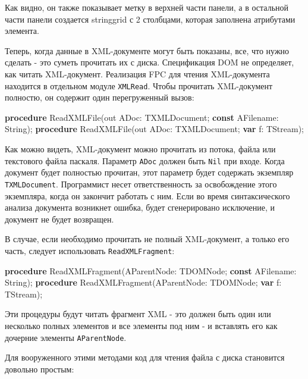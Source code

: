 \documentclass[
]{article}
\newenvironment{Shaded}{}{}
\newcommand{\DataTypeTok}[1]{\textcolor[rgb]{0.56,0.13,0.00}{#1}}
\newcommand{\KeywordTok}[1]{\textcolor[rgb]{0.00,0.44,0.13}{\textbf{#1}}}
\newcommand{\NormalTok}[1]{#1}
\begin{document}
Как видно, он также показывает метку в верхней части панели, а в
остальной части панели создается stringgrid с 2 столбцами, которая
заполнена атрибутами элемента.

Теперь, когда данные в XML-документе могут быть показаны, все, что нужно
сделать - это суметь прочитать их с диска. Спецификация DOM не
определяет, как читать XML-документ. Реализация FPC для чтения
XML-документа находится в отдельном модуле \texttt{XMLRead}. Чтобы
прочитать XML-документ полностю, он содержит один перегруженный вызов:

\begin{Shaded}
\begin{Highlighting}[]
\KeywordTok{procedure}\NormalTok{ ReadXMLFile(out ADoc: TXMLDocument; }\KeywordTok{const}\NormalTok{ AFilename: }\DataTypeTok{String}\NormalTok{);}
\KeywordTok{procedure}\NormalTok{ ReadXMLFile(out ADoc: TXMLDocument; }\KeywordTok{var}\NormalTok{ f: TStream);}
\end{Highlighting}
\end{Shaded}

Как можно видеть, XML-документ можно прочитать из потока, файла или
текстового файла паскаля. Параметр \texttt{ADoc} должен быть
\texttt{Nil} при входе. Когда документ будет полностью прочитан, этот
параметр будет содержать экземпляр \texttt{TXMLDocument}. Программист
несет ответственность за освобождение этого экземпляра, когда он
закончит работать с ним. Если во время синтаксического анализа документа
возникнет ошибка, будет сгенерировано исключение, и документ не будет
возвращен.

В случае, если необходимо прочитать не полный XML-документ, а только его
часть, следует использовать \texttt{ReadXMLFragment}:

\begin{Shaded}
\begin{Highlighting}[]
\KeywordTok{procedure}\NormalTok{ ReadXMLFragment(AParentNode: TDOMNode; }\KeywordTok{const}\NormalTok{ AFilename: }\DataTypeTok{String}\NormalTok{);}
\KeywordTok{procedure}\NormalTok{ ReadXMLFragment(AParentNode: TDOMNode; }\KeywordTok{var}\NormalTok{ f: TStream);}
\end{Highlighting}
\end{Shaded}

Эти процедуры будут читать фрагмент XML - это должен быть один или
несколько полных элементов и все элементы под ним - и вставлять его как
дочерние элементы \texttt{AParentNode}.

Для вооруженного этими методами код для чтения файла с диска становится
довольно простым:
\end{document}
